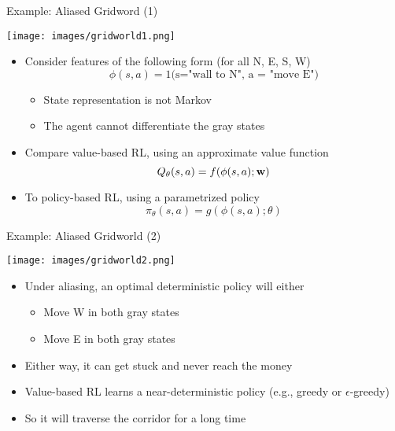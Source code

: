 \documentclass[aspectratio=169]{../latex_main/tntbeamer}  %
\begin{document}
\begin{frame}[c]{Example: Aliased Gridword (1)}
	
	\vspace{-1.6em}
	\begin{center}
		\texttt{[image: images/gridworld1.png]}
	\end{center}
	
	\begin{itemize}
		\item Consider features of the following form (for all N, E, S, W)
		$$\phi(s,a) = 1\text{(s="wall to N", a = "move E")}$$
		\vspace{-1em}
		\begin{itemize}
			\item State representation is not Markov
			\item The agent \alert{cannot} differentiate the gray states
		\end{itemize}
		\item Compare value-based RL, using an approximate value function
		$$Q_\theta (s,a) = f(\phi(s,a); \mathbf{w})$$
		\item To policy-based RL, using a parametrized policy
		$$\pi_\theta(s,a) = g(\phi(s,a); \theta) $$ 
	\end{itemize}
	
\end{frame}
\begin{frame}[c]{Example: Aliased Gridworld (2)}
	
	\begin{center}
		\texttt{[image: images/gridworld2.png]}
	\end{center}
	
	\begin{itemize}
		\item Under aliasing, an optimal \alert{deterministic} policy will either
		\begin{itemize}
			\item Move W in both gray states 
			\item Move E in both gray states
		\end{itemize}
		\item Either way, it can get stuck and never reach the money
		\item Value-based RL learns a near-deterministic policy (e.g., greedy or $\epsilon$-greedy)
		\item So it will traverse the corridor for a long time
	\end{itemize}

\end{frame}
\end{document}
